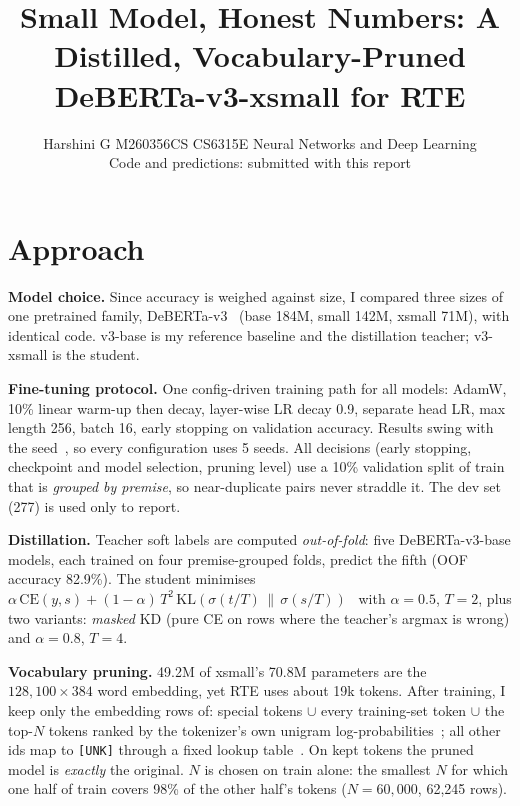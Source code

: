 \documentclass[11pt]{article}
\title{\vspace{-1.6em}\textbf{Small Model, Honest Numbers: A Distilled, Vocabulary-Pruned DeBERTa-v3-xsmall for RTE}}
\author{Harshini G \quad M260356CS \quad CS6315E Neural Networks and Deep Learning\\
\small Code and predictions: submitted with this report}
\date{\vspace{-2em}}
\begin{document}
\maketitle

\vspace{-1.2em}\section{Approach}
\textbf{Model choice.} Since accuracy is weighed against size, I compared three sizes of one pretrained family, DeBERTa-v3~\cite{he2021deberta,he2023debertav3} (base 184M, small 142M, xsmall 71M), with identical code. v3-base is my reference baseline and the distillation teacher; v3-xsmall is the student.

\textbf{Fine-tuning protocol.} One config-driven training path for all models: AdamW, 10\% linear warm-up then decay, layer-wise LR decay 0.9, separate head LR, max length 256, batch 16, early stopping on validation accuracy. Results swing with the seed~\cite{mosbach2021stability}, so every configuration uses 5 seeds. All decisions (early stopping, checkpoint and model selection, pruning level) use a 10\% validation split of train that is \emph{grouped by premise}, so near-duplicate pairs never straddle it. The dev set (277) is used only to report.

\textbf{Distillation.} Teacher soft labels are computed \emph{out-of-fold}: five DeBERTa-v3-base models, each trained on four premise-grouped folds, predict the fifth (OOF accuracy 82.9\%). The student minimises $\alpha\,\mathrm{CE}(y, s) + (1-\alpha)\,T^2\,\mathrm{KL}(\sigma(t/T)\,\|\,\sigma(s/T))$~\cite{hinton2015distilling} with $\alpha{=}0.5$, $T{=}2$, plus two variants: \emph{masked} KD (pure CE on rows where the teacher's argmax is wrong) and $\alpha{=}0.8$, $T{=}4$.

\textbf{Vocabulary pruning.} 49.2M of xsmall's 70.8M parameters are the $128{,}100\times384$ word embedding, yet RTE uses about 19k tokens. After training, I keep only the embedding rows of: special tokens $\cup$ every training-set token $\cup$ the top-$N$ tokens ranked by the tokenizer's own unigram log-probabilities~\cite{kudo2018subword}; all other ids map to \texttt{[UNK]} through a fixed lookup table~\cite{abdaoui2020load}. On kept tokens the pruned model is \emph{exactly} the original. $N$ is chosen on train alone: the smallest $N$ for which one half of train covers 98\% of the other half's tokens ($N{=}60{,}000$, 62,245 rows).
\end{document}
